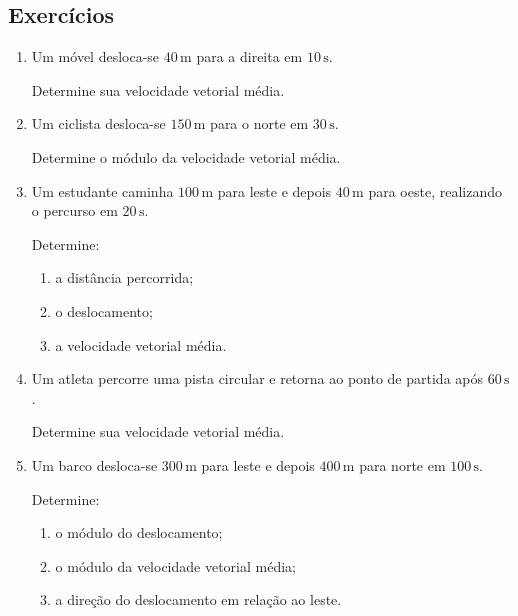 \documentclass[a4paper,12pt]{article}
\begin{document}
\subsection*{Exercícios}

\begin{enumerate}

\item Um móvel desloca-se $40\,\text{m}$ para a direita em
$10\,\text{s}$.

Determine sua velocidade vetorial média.

\vspace{1.5cm}


\item Um ciclista desloca-se $150\,\text{m}$ para o norte em
$30\,\text{s}$.

Determine o módulo da velocidade vetorial média.

\vspace{1.5cm}


\item Um estudante caminha $100\,\text{m}$ para leste e depois
$40\,\text{m}$ para oeste, realizando o percurso em $20\,\text{s}$.

Determine:

\begin{enumerate}
    \item a distância percorrida;
    \item o deslocamento;
    \item a velocidade vetorial média.
\end{enumerate}

\vspace{1.5cm}


\item Um atleta percorre uma pista circular e retorna ao ponto
de partida após $60\,\text{s}$.

Determine sua velocidade vetorial média.

\vspace{1.5cm}


\item Um barco desloca-se $300\,\text{m}$ para leste e depois
$400\,\text{m}$ para norte em $100\,\text{s}$.

Determine:

\begin{enumerate}
    \item o módulo do deslocamento;
    \item o módulo da velocidade vetorial média;
    \item a direção do deslocamento em relação ao leste.
\end{enumerate}

\end{enumerate}
\end{document}
